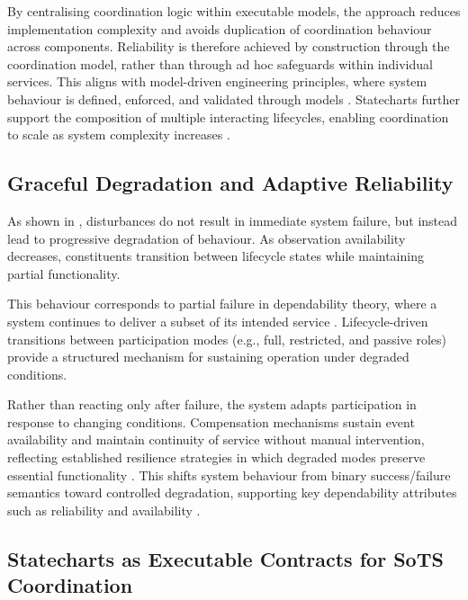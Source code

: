 By centralising coordination logic within executable models, the approach reduces implementation complexity and avoids duplication of coordination behaviour across components. Reliability is therefore achieved by construction through the coordination model, rather than through ad hoc safeguards within individual services. This aligns with model-driven engineering principles, where system behaviour is defined, enforced, and validated through models \cite{stahl2006model}. Statecharts further support the composition of multiple interacting lifecycles, enabling coordination to scale as system complexity increases \cite{harel1987statecharts}.


\subsection{Graceful Degradation and Adaptive Reliability}

As shown in , disturbances do not result in immediate system failure, but instead lead to progressive degradation of behaviour. As observation availability decreases, constituents transition between lifecycle states while maintaining partial functionality.

This behaviour corresponds to partial failure in dependability theory, where a system continues to deliver a subset of its intended service \cite{avizienis2004basic}. Lifecycle-driven transitions between participation modes (e.g., full, restricted, and passive roles) provide a structured mechanism for sustaining operation under degraded conditions.

Rather than reacting only after failure, the system adapts participation in response to changing conditions. Compensation mechanisms sustain event availability and maintain continuity of service without manual intervention, reflecting established resilience strategies in which degraded modes preserve essential functionality \cite{laprie1985dependable}. This shifts system behaviour from binary success/failure semantics toward controlled degradation, supporting key dependability attributes such as reliability and availability \cite{avizienis2004basic}.


\subsection{Statecharts as Executable Contracts for SoTS Coordination}

